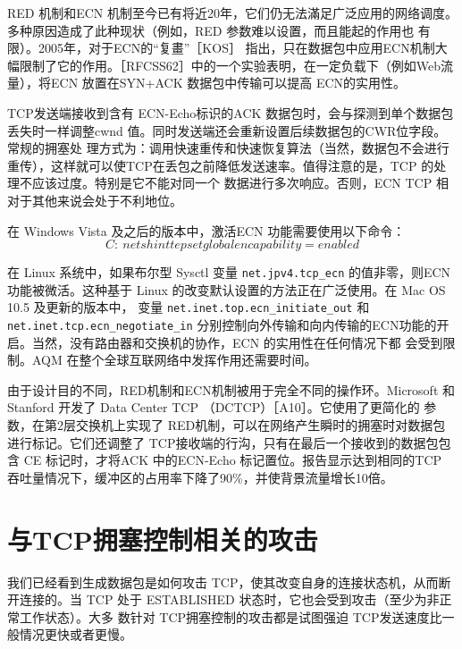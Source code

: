 \begin{tcolorbox}
    RED 机制和ECN 机制至今已有将近20年，它们仍无法滿足广泛应用的网络调度。多种原因造成了此种现状（例如，RED 参数难以设置，而且能起的作用也
    有限）。2005年，对于ECN的“复畫”［KOS］ 指出，只在数据包中应用ECN机制大幅限制了它的作用。［RFCSS62］中的一个实验表明，在一定负载下（例如Web流
    量），将ECN 放置在SYN+ACK 数据包中传输可以提高 ECN的实用性。
\end{tcolorbox}

TCP发送端接收到含有 ECN-Echo标识的ACK 数据包时，会与探测到单个数据包丢失时一样调整cwnd 值。同时发送端还会重新设置后续数据包的CWR位字段。常规的拥塞处
理方式为：调用快速重传和快速恢复算法（当然，数据包不会进行重传），这样就可以使TCP在丢包之前降低发送速率。值得注意的是，TCP 的处理不应该过度。特别是它不能对同一个
数据进行多次响应。否则，ECN TCP 相对于其他来说会处于不利地位。

在 Windows Vista 及之后的版本中，激活ECN 功能需要使用以下命令：
\begin{equation}
    C: \> netsh int tep set global encapability=enabled
\end{equation}

在 Linux 系统中，如果布尔型 Sysctl 变量 \verb|net.jpv4.tcp_ecn| 的值非零，则ECN 功能被微活。这种基于 Linux 的改变默认设置的方法正在广泛使用。在 Mac OS 10.5 及更新的版本中，
变量 \verb|net.inet.top.ecn_initiate_out| 和 \verb|net.inet.tcp.ecn_negotiate_in| 分别控制向外传输和向内传输的ECN功能的开启。当然，没有路由器和交换机的协作，ECN 的实用性在任何情况下都
会受到限制。AQM 在整个全球互联网络中发挥作用还需要时间。

\begin{tcolorbox}
    由于设计目的不同，RED机制和ECN机制被用于完全不同的操作环。Microsoft 和 Stanford 开发了 Data Center TCP （DCTCP）［A10］。它使用了更简化的
    参数，在第2层交换机上实现了 RED机制，可以在网络产生瞬时的拥塞时对数据包进行标记。它们还调整了 TCP接收端的行沟，只有在最后一个接收到的数据包包含
    CE 标记时，才将ACK 中的ECN-Echo 标记置位。报告显示达到相同的TCP 吞吐量情况下，缓冲区的占用率下降了90\%，并使背景流量增长10倍。
\end{tcolorbox}

\section{与TCP拥塞控制相关的攻击}
我们已经看到生成数据包是如何攻击 TCP，使其改变自身的连接状态机，从而断开连接的。当 TCP 处于 ESTABLISHED 状态时，它也会受到攻击（至少为非正常工作状态）。大多
数针对 TCP拥塞控制的攻击都是试图强迫 TCP发送速度比一般情况更快或者更慢。

